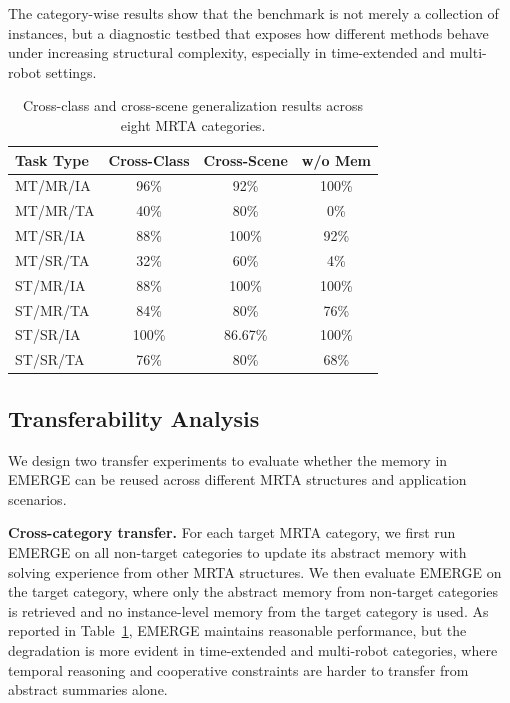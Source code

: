 \documentclass[letterpaper,journal]{IEEEtran}
\begin{document}
The category-wise results show that the benchmark is not merely a collection of instances, but a diagnostic testbed that exposes how different methods behave under increasing structural complexity, especially in time-extended and multi-robot settings.
\begin{table}[htbp]
\centering
\caption{Cross-class and cross-scene generalization results across eight MRTA categories.}
\label{tab:mrta_cross_generalization}
\begin{tabular}{lccc}
\toprule
\textbf{Task Type} & \textbf{Cross-Class} & \textbf{Cross-Scene}   & \textbf{w/o Mem} \\
\midrule
MT/MR/IA & 96\%  & 92\%    & 100\% \\
MT/MR/TA & 40\%  & 80\%    & 0\% \\
MT/SR/IA & 88\%  & 100\%   & 92\% \\
MT/SR/TA & 32\%  & 60\%    & 4\% \\
ST/MR/IA & 88\%  & 100\%   & 100\%  \\
ST/MR/TA & 84\%  & 80\%    & 76\% \\
ST/SR/IA & 100\% & 86.67\% & 100\%  \\
ST/SR/TA & 76\%  & 80\%    & 68\%   \\
\bottomrule
\end{tabular}
\end{table}



\subsection{Transferability Analysis}
\label{sec}

We design two transfer experiments to evaluate whether the memory in EMERGE can be reused across different MRTA structures and application scenarios.

\textbf{Cross-category transfer.} For each target MRTA category, we first run EMERGE on all non-target categories to update its abstract memory with solving experience from other MRTA structures. We then evaluate EMERGE on the target category, where only the abstract memory from non-target categories is retrieved and no instance-level memory from the target category is used. As reported in Table~\ref{tab:mrta_cross_generalization}, EMERGE maintains reasonable performance, but the degradation is more evident in time-extended and multi-robot categories, where temporal reasoning and cooperative constraints are harder to transfer from abstract summaries alone.
\end{document}
